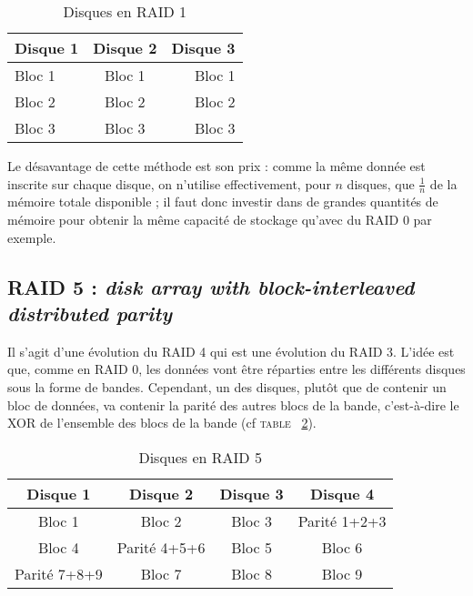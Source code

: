 \begin{table}[h]
    \centering
    \caption{\label{mirroring} Disques en RAID 1}
    \begin{tabular}{|l|c|r|}
        \hline
        \textbf{Disque 1} & \textbf{Disque 2} & \textbf{Disque 3} \\
        \hline
        Bloc 1 & Bloc 1 & Bloc 1 \\
        \hline
        Bloc 2 & Bloc 2 & Bloc 2 \\
        \hline
        Bloc 3 & Bloc 3 & Bloc 3 \\
        \hline
    \end{tabular}
\end{table}

Le désavantage de cette méthode est son prix : comme la même donnée est inscrite sur chaque disque, on n'utilise effectivement, pour $n$ disques, que $\frac{1}{n}$ de la mémoire totale disponible ; il faut donc investir dans de grandes quantités de mémoire pour obtenir la même capacité de stockage qu'avec du RAID 0 par exemple.

\subsection{RAID 5 : \textit{disk array with block-interleaved distributed parity}}
Il s'agit d'une évolution du RAID 4 qui est une évolution du RAID 3. L'idée est que, comme en RAID 0, les données vont être réparties entre les différents disques sous la forme de bandes. Cependant, un des disques, plutôt que de contenir un bloc de données, va contenir la parité des autres blocs de la bande, c'est-à-dire le XOR de l'ensemble des blocs de la bande (cf \textsc{table ~\ref{raid5}}). 

\begin{table}[h]
    \centering
    \caption{\label{raid5} Disques en RAID 5}
    \begin{tabular}{|c|c|c|c|}
        \hline
        \textbf{Disque 1} & \textbf{Disque 2} & \textbf{Disque 3} & \textbf{Disque 4}\\
        \hline
        Bloc 1 & Bloc 2 & Bloc 3 & Parité 1+2+3 \\
        \hline
        Bloc 4 & Parité 4+5+6 & Bloc 5 & Bloc 6 \\
        \hline
        Parité 7+8+9 & Bloc 7 & Bloc 8 & Bloc 9 \\
        \hline
    \end{tabular}
\end{table}

